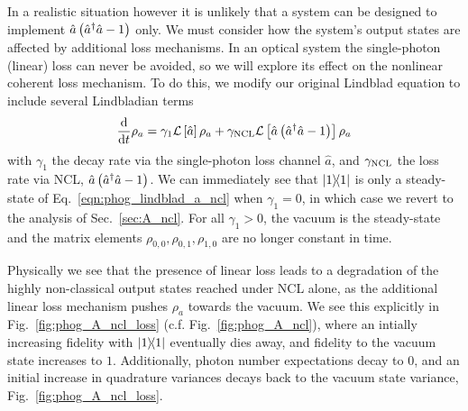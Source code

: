 In a realistic situation however it is unlikely that a system can be designed to implement $\hat{a}\left(\hat{a}^\dagger \hat{a} - 1\right)$ only. We must consider how the system's output states are affected by additional loss mechanisms. In an optical system the single-photon (linear) loss can never be avoided, so we will explore its effect on the nonlinear coherent loss mechanism. To do this, we modify our original Lindblad equation to include several Lindbladian terms
\begin{equation}\label{eqn:phog_lindblad_a_ncl}
\frac{\mathrm{d}}{\mathrm{d}t} \rho_a =  \gamma_1 \mathcal{L}\left[\hat{a}\right]\rho_a + \gamma_{\text{NCL}} \mathcal{L}\left[\hat{a}\left(\hat{a}^\dagger \hat{a} - 1\right)\right]\rho_a
\end{equation}
with $\gamma_1$ the decay rate via the single-photon loss channel $\hat{a}$, and $\gamma_{\text{NCL}}$ the loss rate via NCL, $\hat{a}\left(\hat{a}^\dagger \hat{a} - 1\right)$. We can immediately see that $\dyad{1}$ is only a steady-state of Eq.~\ref{eqn:phog_lindblad_a_ncl} when $\gamma_1 = 0$, in which case we revert to the analysis of Sec.~\ref{sec:A_ncl}. For all $\gamma_1 > 0$, the vacuum is the steady-state and the matrix elements $\rho_{0, 0}, \rho_{0, 1}, \rho_{1, 0}$ are no longer constant in time. 

Physically we see that the presence of linear loss leads to a degradation of the highly non-classical output states reached under NCL alone, as the additional linear loss mechanism pushes $\rho_a$ towards the vacuum. We see this explicitly in Fig.~\ref{fig:phog_A_ncl_loss} (c.f. Fig.~\ref{fig:phog_A_ncl}), where an intially increasing fidelity with $\dyad{1}$ eventually dies away, and fidelity to the vacuum state increases to $1$. Additionally, photon number expectations decay to $0$, and an initial increase in quadrature variances decays back to the vacuum state variance, Fig.~\ref{fig:phog_A_ncl_loss}.





